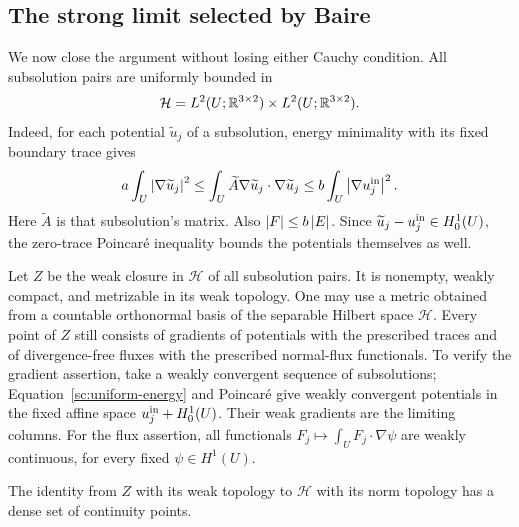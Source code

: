 \subsection{The strong limit selected by Baire}

We now close the argument without losing either Cauchy condition.
All subsolution pairs are uniformly bounded in
\[
 \mathcal H=L^2(U;\mathbb R^{3\times2})\times L^2(U;\mathbb R^{3\times2}).
\]
Indeed, for each potential $\widetilde u_j$ of a subsolution,
energy minimality with its fixed boundary trace gives
\begin{equation}
 \label{sc:uniform-energy}
 a\int_U\left\lvert \nabla\widetilde u_j\right\rvert^2
 \leq\int_U \widetilde A\nabla\widetilde u_j\cdot\nabla\widetilde u_j
 \leq b\int_U\left\lvert \nabla u_j^{\rm in}\right\rvert^2.
\end{equation}
Here $\widetilde A$ is that subsolution's matrix.
Also $\left\lvert F\right\rvert\leq b\left\lvert E\right\rvert$. Since
$\widetilde u_j-u_j^{\rm in}\in H^1_0(U)$, the zero-trace Poincar\'e
inequality bounds the potentials themselves as well.

Let $Z$ be the weak closure in $\mathcal H$ of all subsolution
pairs. It is nonempty, weakly compact, and metrizable in its weak
topology. One may use a metric obtained from a countable
orthonormal basis of the separable Hilbert space $\mathcal H$.
Every point of $Z$ still consists of gradients of potentials with
the prescribed traces and of divergence-free fluxes with the
prescribed normal-flux functionals. To verify the gradient
assertion, take a weakly convergent sequence of subsolutions;
Equation~\eqref{sc:uniform-energy} and Poincar\'e give weakly
convergent potentials in the fixed affine space
$u_j^{\rm in}+H^1_0(U)$. Their weak gradients are the limiting columns.
For the flux assertion, all functionals
$F_j\mapsto\int_U F_j\cdot\nabla\psi$ are weakly continuous,
for every fixed $\psi\in H^1(U)$.

\begin{lemma}
\label{sc:baire}
The identity from $Z$ with its weak topology to $\mathcal H$ with
its norm topology has a dense set of continuity points.
\end{lemma}

